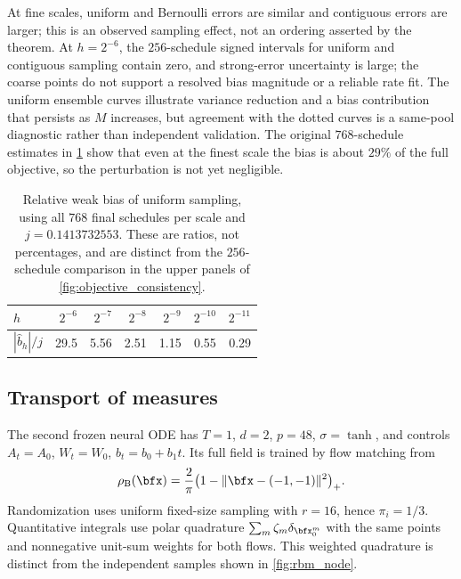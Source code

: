 At fine scales, uniform and Bernoulli errors are similar and contiguous errors are larger; this is an observed sampling effect, not an ordering asserted by the theorem. At $h=2^{-6}$, the $256$-schedule signed intervals for uniform and contiguous sampling contain zero, and strong-error uncertainty is large; the coarse points do not support a resolved bias magnitude or a reliable rate fit. The uniform ensemble curves illustrate variance reduction and a bias contribution that persists as $M$ increases, but agreement with the dotted curves is a same-pool diagnostic rather than independent validation. The original $768$-schedule estimates in \cref{tab:objective_relative_bias} show that even at the finest scale the bias is about $29\%$ of the full objective, so the perturbation is not yet negligible.

\begin{table}[htbp]
\centering
\begin{tabular}{lrrrrrr}
\toprule
$h$ &$2^{-6}$&$2^{-7}$&$2^{-8}$&$2^{-9}$&$2^{-10}$&$2^{-11}$\\
\midrule
$|\hat b_h|/j$ &29.5&5.56&2.51&1.15&0.55&0.29\\
\bottomrule
\end{tabular}
\caption{Relative weak bias of uniform sampling, using all $768$ final schedules per scale and $j=0.1413732553$. These are ratios, not percentages, and are distinct from the $256$-schedule comparison in the upper panels of \cref{fig:objective_consistency}.}
\label{tab:objective_relative_bias}
\end{table}

\subsection{Transport of measures}\label{subsec:num_transport}

The second frozen neural ODE has $T=1$, $d=2$, $p=48$, $\sigma=\tanh$, and controls $A_t=A_0$, $W_t=W_0$, $b_t=b_0+b_1t$. Its full field is trained by flow matching from
\[
\rho_{\mathrm B}(\bfx)=\frac{2}{\pi}\bigl(1-\|\bfx-(-1,-1)\|^2\bigr)_+.
\]
Randomization uses uniform fixed-size sampling with $r=16$, hence $\pi_i=1/3$. Quantitative integrals use polar quadrature $\sum_m\zeta_m\delta_{\bfx_0^m}$ with the same points and nonnegative unit-sum weights for both flows. This weighted quadrature is distinct from the independent samples shown in \cref{fig:rbm_node}.

